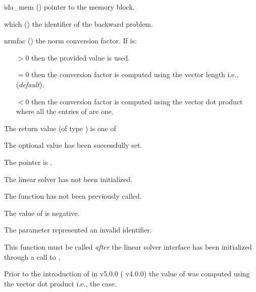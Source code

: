 {
  \begin{args}
  \item[ida\_mem] ()
    pointer to the {\idas} memory block.
  \item[which] ()
    the identifier of the backward problem.
  \item[nrmfac] ()
    the norm conversion factor. If  is:
    \begin{itemize}
    \item[$> 0$] then the provided value is used.
    \item[$= 0$] then the conversion factor is computed using the vector length
      i.e.,  (\textit{default}).
    \item[$< 0$] then the conversion factor is computed using the vector dot
      product  where all the entries of  are
      one.
    \end{itemize}
  \end{args}
}
{
  The return value  (of type ) is one of
  \begin{args}
  \item[\Id{IDALS\_SUCCESS}]
    The optional value has been successfully set.
  \item[\Id{IDALS\_MEM\_NULL}]
    The  pointer is .
  \item[\Id{IDALS\_LMEM\_NULL}]
    The {\idals} linear solver has not been initialized.
  \item[\Id{IDALS\_NO\_ADJ}]
    The function  has not been previously called.
  \item[\Id{IDALS\_ILL\_INPUT}]
    The value of  is negative.
  \item[\Id{IDALS\_ILL\_INPUT}]
    The parameter  represented an invalid identifier.
  \end{args}
}
{
  This function must be called \emph{after} the {\idals} linear solver
  interface has been initialized through a call to
  .

  Prior to the introduction of  in {\sundials} v5.0.0
  ({\idas} v4.0.0) the value of  was computed using the vector
  dot product i.e., the  case.
}
